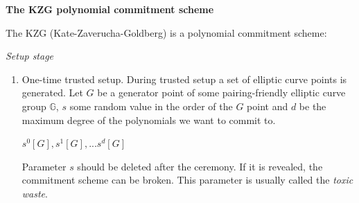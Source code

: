 \documentclass[../lecture-notes.tex]{subfiles}
\begin{document}
\textbf{The KZG polynomial commitment scheme}

\vspace{0.5 cm}


The KZG (Kate-Zaverucha-Goldberg) is a polynomial commitment scheme:

\textit{Setup stage}

\begin{enumerate}
    \item One-time trusted setup. During trusted setup a set of elliptic curve points is generated. Let $G$ be a generator point of some pairing-friendly
    elliptic curve group $\mathbb{G}$, $s$ some random value in the order of the $G$ point and $d$ be the maximum degree of the polynomials we want to commit to.

    \begin{center}
        $s^0[G], s^1[G], ... s^d[G]$
    \end{center}

    Parameter $s$ should be deleted after the ceremony. If it is revealed, the commitment scheme can be broken. This parameter is usually called the \textit{toxic waste}.

\end{enumerate}
\end{document}
